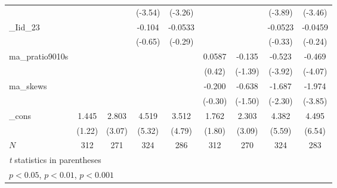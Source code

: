 {\begin{tabular}{l*{8}{c}}
            &                     &                     &     (-3.54)         &     (-3.26)         &                     &                     &     (-3.89)         &     (-3.46)         \\
[1em]
\_Iid\_23     &                     &                     &      -0.104         &     -0.0533         &                     &                     &     -0.0523         &     -0.0459         \\
            &                     &                     &     (-0.65)         &     (-0.29)         &                     &                     &     (-0.33)         &     (-0.24)         \\
[1em]
ma\_pratio9010s&                     &                     &                     &                     &      0.0587         &      -0.135         &      -0.523\sym{***}&      -0.469\sym{***}\\
            &                     &                     &                     &                     &      (0.42)         &     (-1.39)         &     (-3.92)         &     (-4.07)         \\
[1em]
ma\_skews    &                     &                     &                     &                     &      -0.200         &      -0.638         &      -1.687\sym{*}  &      -1.974\sym{***}\\
            &                     &                     &                     &                     &     (-0.30)         &     (-1.50)         &     (-2.30)         &     (-3.85)         \\
[1em]
\_cons      &       1.445         &       2.803\sym{**} &       4.519\sym{***}&       3.512\sym{***}&       1.762         &       2.303\sym{**} &       4.382\sym{***}&       4.495\sym{***}\\
            &      (1.22)         &      (3.07)         &      (5.32)         &      (4.79)         &      (1.80)         &      (3.09)         &      (5.59)         &      (6.54)         \\
\hline
\(N\)       &         312         &         271         &         324         &         286         &         312         &         270         &         324         &         283         \\
\hline\hline
\multicolumn{9}{l}{\footnotesize \textit{t} statistics in parentheses}\\
\multicolumn{9}{l}{\footnotesize \sym{*} \(p<0.05\), \sym{**} \(p<0.01\), \sym{***} \(p<0.001\)}\\
\end{tabular}
}
